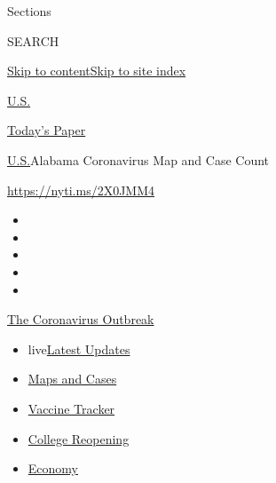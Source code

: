 Sections

SEARCH

\protect\hyperlink{site-content}{Skip to
content}\protect\hyperlink{site-index}{Skip to site index}

\href{https://www.nytimes.com/section/us}{U.S.}

\href{https://myaccount.nytimes.com/auth/login?response_type=cookie\&client_id=vi}{}

\href{https://www.nytimes.com/section/todayspaper}{Today's Paper}

\href{/section/us}{U.S.}\textbar{}Alabama Coronavirus Map and Case Count

\url{https://nyti.ms/2X0JMM4}

\begin{itemize}
\item
\item
\item
\item
\item
\end{itemize}

\href{https://www.nytimes.com/news-event/coronavirus?action=click\&pgtype=Article\&state=default\&region=TOP_BANNER\&context=storylines_menu}{The
Coronavirus Outbreak}

\begin{itemize}
\tightlist
\item
  live\href{https://www.nytimes.com/2020/08/04/world/coronavirus-cases.html?action=click\&pgtype=Article\&state=default\&region=TOP_BANNER\&context=storylines_menu}{Latest
  Updates}
\item
  \href{https://www.nytimes.com/interactive/2020/us/coronavirus-us-cases.html?action=click\&pgtype=Article\&state=default\&region=TOP_BANNER\&context=storylines_menu}{Maps
  and Cases}
\item
  \href{https://www.nytimes.com/interactive/2020/science/coronavirus-vaccine-tracker.html?action=click\&pgtype=Article\&state=default\&region=TOP_BANNER\&context=storylines_menu}{Vaccine
  Tracker}
\item
  \href{https://www.nytimes.com/2020/08/02/us/covid-college-reopening.html?action=click\&pgtype=Article\&state=default\&region=TOP_BANNER\&context=storylines_menu}{College
  Reopening}
\item
  \href{https://www.nytimes.com/live/2020/08/04/business/stock-market-today-coronavirus?action=click\&pgtype=Article\&state=default\&region=TOP_BANNER\&context=storylines_menu}{Economy}
\end{itemize}

